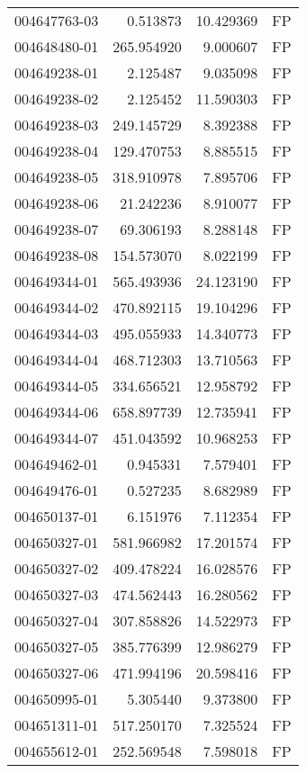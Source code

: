 \begin{tabular}{lrrl}
004647763-03 &    0.513873 &    10.429369 &   FP \\
004648480-01 &  265.954920 &     9.000607 &   FP \\
004649238-01 &    2.125487 &     9.035098 &   FP \\
004649238-02 &    2.125452 &    11.590303 &   FP \\
004649238-03 &  249.145729 &     8.392388 &   FP \\
004649238-04 &  129.470753 &     8.885515 &   FP \\
004649238-05 &  318.910978 &     7.895706 &   FP \\
004649238-06 &   21.242236 &     8.910077 &   FP \\
004649238-07 &   69.306193 &     8.288148 &   FP \\
004649238-08 &  154.573070 &     8.022199 &   FP \\
004649344-01 &  565.493936 &    24.123190 &   FP \\
004649344-02 &  470.892115 &    19.104296 &   FP \\
004649344-03 &  495.055933 &    14.340773 &   FP \\
004649344-04 &  468.712303 &    13.710563 &   FP \\
004649344-05 &  334.656521 &    12.958792 &   FP \\
004649344-06 &  658.897739 &    12.735941 &   FP \\
004649344-07 &  451.043592 &    10.968253 &   FP \\
004649462-01 &    0.945331 &     7.579401 &   FP \\
004649476-01 &    0.527235 &     8.682989 &   FP \\
004650137-01 &    6.151976 &     7.112354 &   FP \\
004650327-01 &  581.966982 &    17.201574 &   FP \\
004650327-02 &  409.478224 &    16.028576 &   FP \\
004650327-03 &  474.562443 &    16.280562 &   FP \\
004650327-04 &  307.858826 &    14.522973 &   FP \\
004650327-05 &  385.776399 &    12.986279 &   FP \\
004650327-06 &  471.994196 &    20.598416 &   FP \\
004650995-01 &    5.305440 &     9.373800 &   FP \\
004651311-01 &  517.250170 &     7.325524 &   FP \\
004655612-01 &  252.569548 &     7.598018 &   FP \\

\end{tabular}
